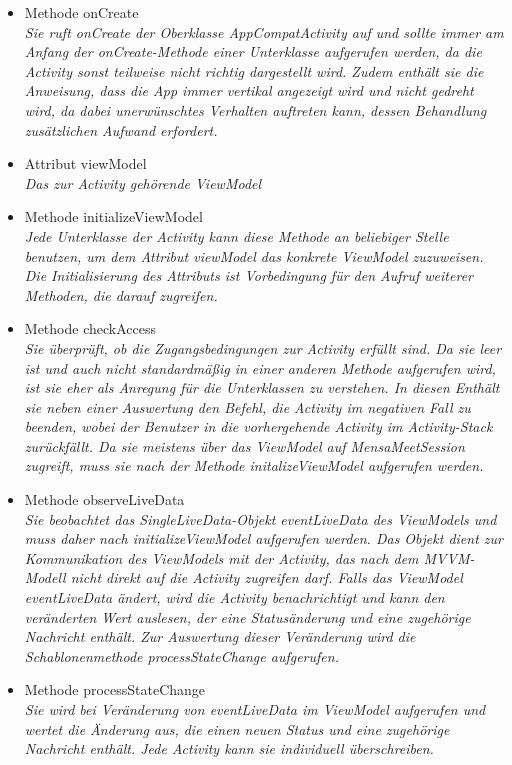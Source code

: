 \documentclass[a4paper]{scrreprt}
\begin{document}
 \begin{itemize}
 \item Methode onCreate \\
 \textit{Sie ruft onCreate der Oberklasse AppCompatActivity auf und sollte immer am Anfang der onCreate-Methode einer Unterklasse aufgerufen werden, da die Activity sonst teilweise nicht richtig dargestellt wird. Zudem enthält sie die Anweisung, dass die App immer vertikal angezeigt wird und nicht gedreht wird, da dabei unerwünschtes Verhalten auftreten kann, dessen Behandlung zusätzlichen Aufwand erfordert.}
\item Attribut viewModel \\
\textit{Das zur Activity gehörende ViewModel}
\item Methode initializeViewModel \\
\textit{Jede Unterklasse der Activity kann diese Methode an beliebiger Stelle benutzen, um dem Attribut viewModel das konkrete ViewModel zuzuweisen. Die Initialisierung des Attributs ist Vorbedingung für den Aufruf weiterer Methoden, die darauf zugreifen.}
\item Methode checkAccess\\
\textit{Sie überprüft, ob die Zugangsbedingungen zur Activity erfüllt sind. Da sie leer ist und auch nicht standardmäßig in einer anderen Methode aufgerufen wird, ist sie eher als Anregung für die Unterklassen zu verstehen. In diesen Enthält sie neben einer Auswertung den Befehl, die Activity im negativen Fall zu beenden, wobei der Benutzer in die vorhergehende Activity im Activity-Stack zurückfällt. Da sie meistens über das ViewModel auf MensaMeetSession zugreift, muss sie nach der Methode initalizeViewModel aufgerufen werden.}
\item Methode observeLiveData\\
\textit{Sie beobachtet das SingleLiveData-Objekt eventLiveData des ViewModels und muss daher nach initializeViewModel aufgerufen werden. Das Objekt dient zur Kommunikation des ViewModels mit der Activity, das nach dem MVVM-Modell nicht direkt auf die Activity zugreifen darf. Falls das ViewModel eventLiveData ändert, wird die Activity benachrichtigt und kann den veränderten Wert auslesen, der eine Statusänderung und eine zugehörige Nachricht enthält. Zur Auswertung dieser Veränderung wird die Schablonenmethode processStateChange aufgerufen.}
\item Methode processStateChange\\
\textit{Sie wird bei Veränderung von eventLiveData im ViewModel aufgerufen und wertet die Änderung aus, die einen neuen Status und eine zugehörige Nachricht enthält. Jede Activity kann sie individuell überschreiben.}

\end{itemize}
\end{document}
